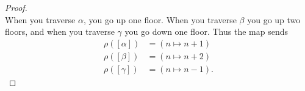 \documentclass{article}
\begin{document}
\begin{proof} \text{} \\
  When you traverse $\alpha$, you go up one floor. When you traverse $\beta$
  you go up two floors, and when you traverse $\gamma$ you go down one floor.
  Thus the map sends \begin{align*}
    \rho([\alpha]) &= (n \mapsto n + 1) \\
    \rho([\beta])  &= (n \mapsto n + 2) \\
    \rho([\gamma]) &= (n \mapsto n - 1).
  \end{align*}
\end{proof}
\end{document}
